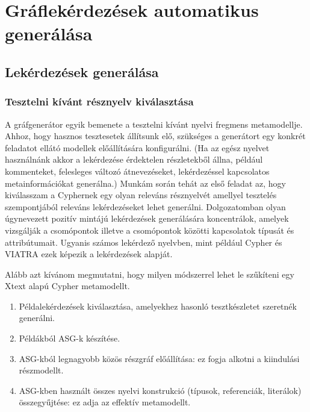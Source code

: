 \chapter{Gráflekérdezések automatikus generálása}
\label{chp:4}

\section{Lekérdezések generálása}

\subsection{Tesztelni kívánt résznyelv kiválasztása}

A gráfgenerátor egyik bemenete a tesztelni kívánt nyelvi fregmens metamodellje. Ahhoz, hogy hasznos tesztesetek állítsunk elő, szükséges a generátort egy konkrét feladatot ellátó modellek előállítására konfigurálni. (Ha az egész nyelvet használnánk akkor a lekérdezése érdektelen részletekből állna, például kommenteket, felesleges változó átnevezéseket, lekérdezéssel kapcsolatos metainformációkat generálna.) Munkám során tehát az első feladat az, hogy kiválasszam a Cyphernek egy olyan releváns résznyelvét amellyel tesztelés szempontjából releváns lekérdezéseket lehet generálni. Dolgozatomban olyan úgynevezett pozitív mintájú lekérdezések generálására koncentrálok, amelyek vizsgálják a csomópontok illetve a csomópontok közötti kapcsolatok típusát és attribútumait. Ugyanis számos lekérdező nyelvben, mint például Cypher \cite{Cypher} és \textsc{VIATRA} \cite{viatra} ezek képezik a lekérdezések alapját. 

%


Alább azt kívánom megmutatni, hogy milyen módszerrel lehet le szűkíteni egy Xtext alapú Cypher metamodellt. 

\begin{enumerate}
	\item  Példalekérdezések kiválasztása, amelyekhez hasonló tesztkészletet szeretnék generálni.
	\item  Példákból ASG-k készítése.
	\item  ASG-kból legnagyobb közös részgráf előállítása: ez fogja  alkotni a kiindulási részmodellt.
	\item  ASG-kben használt összes nyelvi konstrukció (típusok, referenciák, literálok) összegyűjtése: ez adja az effektív metamodellt.
\end{enumerate}   


